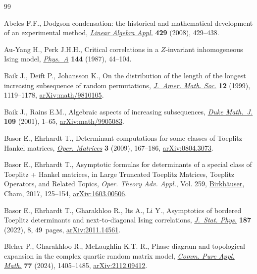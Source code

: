 \begin{thebibliography}{99}
\footnotesize\itemsep=0pt

Abeles F.F., Dodgson condensation: the historical and mathematical development
 of an experimental method, \href{https://doi.org/10.1016/j.laa.2007.11.022}{\textit{Linear Algebra Appl.}} \textbf{429} (2008),
 429--438.

Au-Yang H., Perk J.H.H., Critical correlations in a {$Z$}-invariant
 inhomogeneous {I}sing model, \href{https://doi.org/10.1016/0378-4371(87)90145-2}{\textit{Phys.~A}} \textbf{144} (1987), 44--104.

Baik J., Deift P., Johansson K., On the distribution of the length of the
 longest increasing subsequence of random permutations, \href{https://doi.org/10.1090/S0894-0347-99-00307-0}{\textit{J.~Amer. Math.
 Soc.}} \textbf{12} (1999), 1119--1178, \href{https://arxiv.org/abs/math/9810105}{arXiv:math/9810105}.

Baik J., Rains E.M., Algebraic aspects of increasing subsequences, \href{https://doi.org/10.1215/S0012-7094-01-10911-3}{\textit{Duke
 Math.~J.}} \textbf{109} (2001), 1--65, \href{https://arxiv.org/abs/math/9905083}{arXiv:math/9905083}.

Basor E., Ehrhardt T., Determinant computations for some classes of
 {T}oeplitz--{H}ankel matrices, \href{https://doi.org/10.7153/oam-03-09}{\textit{Oper. Matrices}} \textbf{3} (2009),
 167--186, \href{https://arxiv.org/abs/0804.3073}{arXiv:0804.3073}.

Basor E., Ehrhardt T., Asymptotic formulas for determinants of a special class
 of {T}oeplitz + {H}ankel matrices, in Large {T}runcated {T}oeplitz
 {M}atrices, {T}oeplitz {O}perators, and {R}elated {T}opics, \textit{Oper.
 Theory Adv. Appl.}, Vol. 259, \href{https://doi.org/10.1007/978-3-319-49182-0_9}{Birkh\"auser}, Cham, 2017, 125--154,
 \href{https://arxiv.org/abs/1603.00506}{arXiv:1603.00506}.

Basor E., Ehrhardt T., Gharakhloo R., Its A., Li Y., Asymptotics of bordered
 {T}oeplitz determinants and next-to-diagonal {I}sing correlations,
 \href{https://doi.org/10.1007/s10955-022-02894-7}{\textit{J.~Stat. Phys.}} \textbf{187} (2022), 8, 49~pages,
 \href{https://arxiv.org/abs/2011.14561}{arXiv:2011.14561}.



Bleher P., Gharakhloo R., McLaughlin K.T.-R., Phase diagram and topological
 expansion in the complex quartic random matrix model, \href{https://doi.org/10.1002/cpa.22164}{\textit{Comm. Pure
 Appl. Math.}} \textbf{77} (2024), 1405--1485, \href{https://arxiv.org/abs/2112.09412}{arXiv:2112.09412}.


\end{thebibliography}

